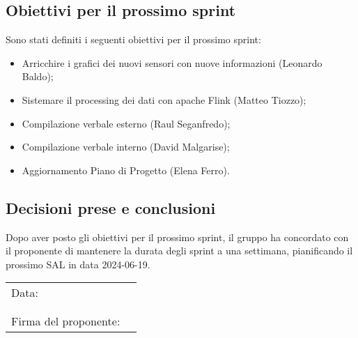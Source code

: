 \documentclass[italian,12pt]{article}
\begin{document}
\subsection{Obiettivi per il prossimo sprint}
Sono stati definiti i seguenti obiettivi per il prossimo sprint:
\begin{itemize}
	\item Arricchire i grafici dei nuovi sensori con nuove informazioni (Leonardo Baldo);
	\item Sistemare il processing dei dati con apache Flink (Matteo Tiozzo);
	\item Compilazione verbale esterno (Raul Seganfredo);
	\item Compilazione verbale interno (David Malgarise);
	\item Aggiornamento Piano di Progetto (Elena Ferro).
\end{itemize}

\subsection{Decisioni prese e conclusioni}
Dopo aver posto gli obiettivi per il prossimo sprint, il gruppo ha concordato con il proponente di mantenere la durata
degli sprint a una settimana, pianificando il prossimo SAL in data 2024-06-19.


\newpage
\begin{table}[b]
	\begin{tabular}{@{}p{5cm}p{10cm}@{}}
		Data:                 & \hrulefill \\
		                      &            \\
		                      &            \\
		Firma del proponente: & \hrulefill \\
	\end{tabular}
\end{table}
\end{document}
